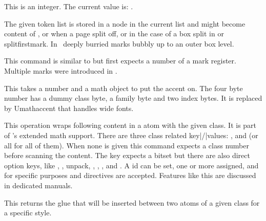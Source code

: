 \stopnewprimitive

\startnewprimitive[title={\prm {luatexversion}}]

This is an integer. The current value is: {\tttf \number\luatexversion}.

\stopnewprimitive

\startoldprimitive[title={\prm {mark}}][obsolete=yes]

The given token list is stored in a node in the current list and might become
content of ,  or  when a page split
off, or in the case of a box split in  or \prm
{splitfirstmark}. In \LUAMETATEX\ deeply burried marks bubbly up to an outer box
level.

\stopoldprimitive

\startoldprimitive[title={\prm {marks}}]

This command is similar to  but first expects a number of a mark
register. Multiple marks were introduced in \ETEX.

\stopoldprimitive

\startoldprimitive[title={\prm {mathaccent}}][obsolete=yes]

This takes a number and a math object to put the accent on. The four byte number
has a dummy class byte, a family byte and two index bytes. It is replaced by \prm
{Umathaccent} that handles wide fonts.

\stopoldprimitive

\startnewprimitive[title={\prm {mathatom}}]

This operation wraps following content in a atom with the given class. It is part
of \LUAMETATEX's extended math support. There are three class related
key|/|values: ,  and  (or \type
{all} for all of them). When none is given this command expects a class number
before scanning the content. The  key expects a bitset but there
are also direct option keys, like , , \type
{unpack}, , , ,  and
. A  id can be set, one or more 
assigned, and for specific purposes  and 
directives are accepted. Features like this are discussed in dedicated manuals.

\stopnewprimitive

\startnewprimitive[title={\prm {mathatomglue}}]

This returns the glue that will be inserted between two atoms of a given class
for a specific style.

